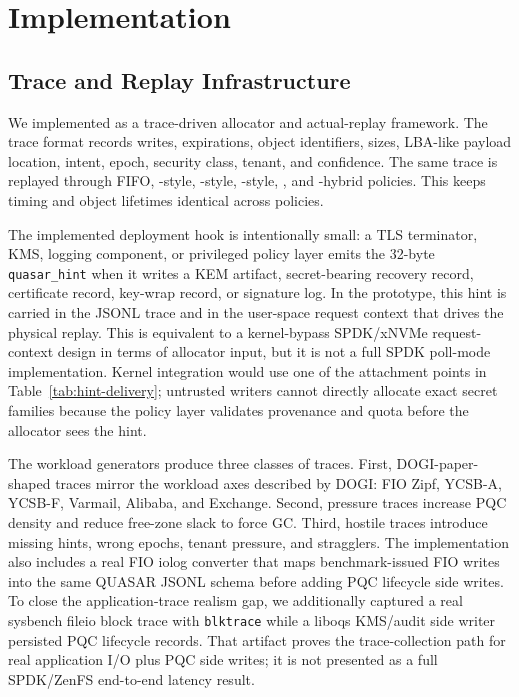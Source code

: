 \section{Implementation}

\subsection{Trace and Replay Infrastructure}

We implemented \system as a trace-driven allocator and actual-\zns replay framework.  The trace format records writes, expirations, object identifiers, sizes, LBA-like payload location, intent, epoch, security class, tenant, and confidence.  The same trace is replayed through FIFO, \sepbit-style, \midas-style, \dogi-style, \system, and \system-\dogi hybrid policies.  This keeps timing and object lifetimes identical across policies.

The implemented deployment hook is intentionally small: a TLS terminator, KMS, logging component, or privileged policy layer emits the 32-byte \texttt{quasar\_hint} when it writes a KEM artifact, secret-bearing recovery record, certificate record, key-wrap record, or signature log.  In the prototype, this hint is carried in the JSONL trace and in the user-space request context that drives the physical replay.  This is equivalent to a kernel-bypass SPDK/xNVMe request-context design in terms of allocator input, but it is not a full SPDK poll-mode implementation.  Kernel integration would use one of the attachment points in Table~\ref{tab:hint-delivery}; untrusted writers cannot directly allocate exact secret families because the policy layer validates provenance and quota before the allocator sees the hint.

The workload generators produce three classes of traces.  First, DOGI-paper-shaped traces mirror the workload axes described by DOGI: FIO Zipf, YCSB-A, YCSB-F, Varmail, Alibaba, and Exchange.  Second, pressure traces increase PQC density and reduce free-zone slack to force GC.  Third, hostile traces introduce missing hints, wrong epochs, tenant pressure, and stragglers.  The implementation also includes a real FIO iolog converter that maps benchmark-issued FIO writes into the same QUASAR JSONL schema before adding PQC lifecycle side writes.  To close the application-trace realism gap, we additionally captured a real sysbench fileio block trace with \texttt{blktrace} while a liboqs KMS/audit side writer persisted PQC lifecycle records.  That artifact proves the trace-collection path for real application I/O plus PQC side writes; it is not presented as a full SPDK/ZenFS end-to-end latency result.

